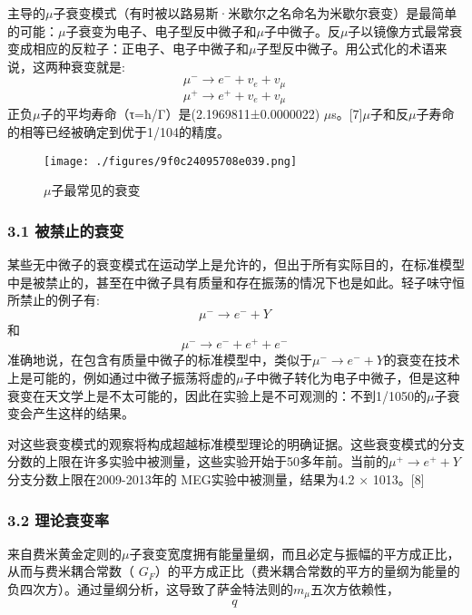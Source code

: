 主导的$\mu$子衰变模式（有时被以路易斯·米歇尔之名命名为米歇尔衰变）是最简单的可能：$\mu$子衰变为电子、电子型反中微子和$\mu$子中微子。反$\mu$子以镜像方式最常衰变成相应的反粒子：正电子、电子中微子和$\mu$子型反中微子。用公式化的术语来说，这两种衰变就是:
\begin{equation}
\mu^- \to e^-+v_e+v_\mu~
\end{equation}\begin{equation}
\mu^+ \to e^+ +v_e+v_\mu~
\end{equation}
正负$\mu$子的平均寿命（τ=ħ/Γ）是(2.1969811±0.0000022) $\mu$s。[7]$\mu$子和反$\mu$子寿命的相等已经被确定到优于1/104的精度。
\begin{figure}[ht]
\centering
\texttt{[image: ./figures/9f0c24095708e039.png]}
\caption{$\mu$子最常见的衰变} \label{fig_MZ_1}
\end{figure}
\subsubsection{3.1 被禁止的衰变}
某些无中微子的衰变模式在运动学上是允许的，但出于所有实际目的，在标准模型中是被禁止的，甚至在中微子具有质量和存在振荡的情况下也是如此。轻子味守恒所禁止的例子有:
\begin{equation}
\mu^- \to e^- + Y~
\end{equation}
和
\begin{equation}
\mu^- \to e^- +e^+ + e^-~
\end{equation}
准确地说，在包含有质量中微子的标准模型中，类似于$\mu^- \to e^- + Y$的衰变在技术上是可能的，例如通过中微子振荡将虚的$\mu$子中微子转化为电子中微子，但是这种衰变在天文学上是不太可能的，因此在实验上是不可观测的：不到1/1050的$\mu$子衰变会产生这样的结果。

对这些衰变模式的观察将构成超越标准模型理论的明确证据。这些衰变模式的分支分数的上限在许多实验中被测量，这些实验开始于50多年前。当前的$\mu^+ \to e^+ + Y$分支分数上限在2009-2013年的 MEG实验中被测量，结果为4.2 × 1013。[8]
\subsubsection{3.2 理论衰变率}
来自费米黄金定则的$\mu$子衰变宽度拥有能量量纲，而且必定与振幅的平方成正比，从而与费米耦合常数（  $G_F$）的平方成正比（费米耦合常数的平方的量纲为能量的负四次方）。通过量纲分析，这导致了萨金特法则的$m_\mu$五次方依赖性，
\begin{equation}
q~
\end{equation}